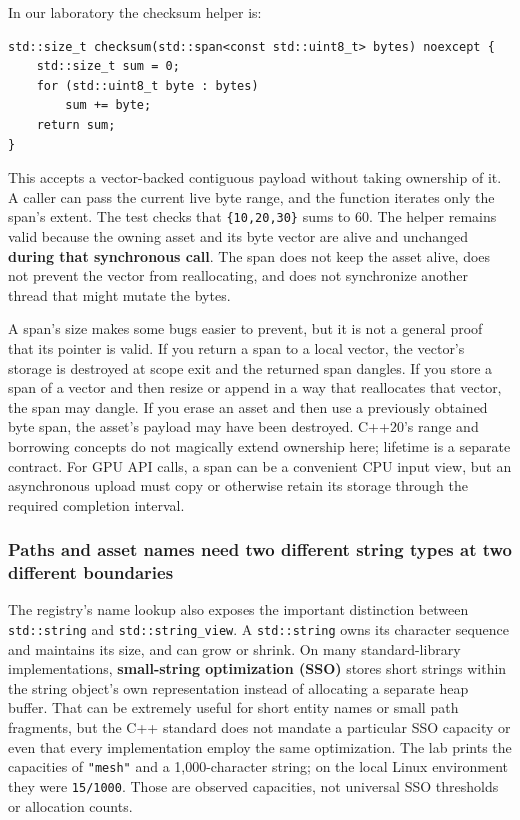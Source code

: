 In our laboratory the checksum helper is:

\begin{verbatim}
std::size_t checksum(std::span<const std::uint8_t> bytes) noexcept {
    std::size_t sum = 0;
    for (std::uint8_t byte : bytes)
        sum += byte;
    return sum;
}
\end{verbatim}

This accepts a vector-backed contiguous payload without taking ownership of it. A caller can pass the current live byte range, and the function iterates only the span's extent. The test checks that \texttt{\{10,20,30\}} sums to 60. The helper remains valid because the owning asset and its byte vector are alive and unchanged \textbf{during that synchronous call}. The span does not keep the asset alive, does not prevent the vector from reallocating, and does not synchronize another thread that might mutate the bytes.

A span's size makes some bugs easier to prevent, but it is not a general proof that its pointer is valid. If you return a span to a local vector, the vector's storage is destroyed at scope exit and the returned span dangles. If you store a span of a vector and then resize or append in a way that reallocates that vector, the span may dangle. If you erase an asset and then use a previously obtained byte span, the asset's payload may have been destroyed. C++20's range and borrowing concepts do not magically extend ownership here; lifetime is a separate contract. For GPU API calls, a span can be a convenient CPU input view, but an asynchronous upload must copy or otherwise retain its storage through the required completion interval.

\subsubsection{Paths and asset names need two different string types at two different boundaries}\label{paths-and-asset-names-need-two-different-string-types-at-two-different-boundaries}

The registry's name lookup also exposes the important distinction between \texttt{std::string} and \texttt{std::string\_view}. A \texttt{std::string} owns its character sequence and maintains its size, and can grow or shrink. On many standard-library implementations, \textbf{small-string optimization (SSO)} stores short strings within the string object's own representation instead of allocating a separate heap buffer. That can be extremely useful for short entity names or small path fragments, but the C++ standard does not mandate a particular SSO capacity or even that every implementation employ the same optimization. The lab prints the capacities of \texttt{"mesh"} and a 1,000-character string; on the local Linux environment they were \texttt{15/1000}. Those are observed capacities, not universal SSO thresholds or allocation counts.

